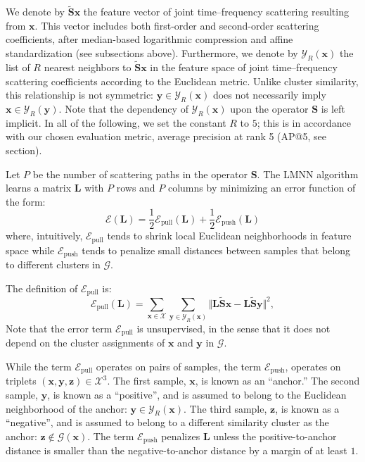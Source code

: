 \documentclass{bmcart}
\newcommand{\ja}[1]{\textcolor{purple}{JA: #1}\xspace}
\newcommand{\lnameref}[1]{%
\bgroup
\let\nmu\MakeLowercase
\nameref{#1}\egroup}
\newcommand{\nmu}{}
\begin{document}
We denote by $\mathbf{\widetilde{S}}\boldsymbol{x}$ the feature vector of joint time--frequency scattering resulting from $\boldsymbol{x}$.
This vector includes both first-order and second-order scattering coefficients, after median-based logarithmic compression and affine standardization (see subsections above).
Furthermore, we denote by $\mathcal{Y}_R (\boldsymbol{x})$ the list of $R$ nearest neighbors to $\mathbf{\widetilde{S}}\boldsymbol{x}$ in the feature space of joint time--frequency scattering coefficients according to the Euclidean metric.
Unlike cluster similarity, this relationship is not symmetric: $\boldsymbol{y}\in\mathcal{Y}_R (\boldsymbol{x})$ does not necessarily imply $\boldsymbol{x}\in\mathcal{Y}_R (\boldsymbol{y})$.
Note that the dependency of $\mathcal{Y}_R (\boldsymbol{x})$ upon the operator $\mathbf{S}$ is left implicit. %
In all of the following, we set the constant $R$ to $5$; this is in accordance with our chosen evaluation metric, average precision at rank 5 (AP@5, see \lnameref{sec:results} section).

Let $P$ be the number of scattering paths in the operator $\mathbf{S}$. The LMNN algorithm learns a matrix $\mathbf{L}$ with $P$ rows and $P$ columns by minimizing an error function of the form:
\begin{equation}
\mathcal{E}(\mathbf{L}) = \frac{1}{2} \mathcal{E}_{\textrm{pull}} (\mathbf{L}) + \frac{1}{2} \mathcal{E}_{\textrm{push}} (\mathbf{L})
\end{equation}
where, intuitively, $\mathcal{E}_{\textrm{pull}}$ tends to shrink local Euclidean neighborhoods in feature space while $\mathcal{E}_{\textrm{push}}$ tends to penalize small distances between samples that belong to different clusters in $\mathcal{G}$.

The definition of $\mathcal{E}_{\textrm{pull}}$ is:
\begin{equation}
\mathcal{E}_{\textrm{pull}} (\mathbf{L}) =
\sum_{\boldsymbol{x}\in\mathcal{X}}
\sum_{\boldsymbol{y}\in\mathcal{Y}_R (\boldsymbol{x})}
\big\Vert
\mathbf{L}\mathbf{\widetilde{S}}\boldsymbol{x} - \mathbf{L}\mathbf{\widetilde{S}}\boldsymbol{y}
\big\Vert^2,
\end{equation}
Note that the error term $\mathcal{E}_\textrm{pull}$ is unsupervised, in the sense that it does not depend on the cluster assignments of $\boldsymbol{x}$ and $\boldsymbol{y}$ in $\mathcal{G}$.

While the term $\mathcal{E}_{\textrm{pull}}$ operates on pairs of samples, the term $\mathcal{E}_{\textrm{push}}$, operates on triplets $(\boldsymbol{x}, \boldsymbol{y}, \boldsymbol{z})\in\mathcal{X}^3$.
The first sample, $\boldsymbol{x}$, is known as an ``anchor.''
The second sample, $\boldsymbol{y}$, is known as a ``positive'', and is assumed to belong to the Euclidean neighborhood of the anchor: $\boldsymbol{y} \in \mathcal{Y}_R (\boldsymbol{x})$.
The third sample, $\boldsymbol{z}$, is known as a ``negative'', and is assumed to belong to a different similarity cluster as the anchor: $\boldsymbol{z}\not\in\mathcal{G}(\boldsymbol{x})$.
The term $\mathcal{E}_{\textrm{push}}$ penalizes $\mathbf{L}$ unless the positive-to-anchor distance is smaller than the negative-to-anchor distance by a margin of at least $1$.
\end{document}
